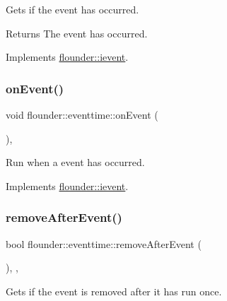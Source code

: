 Gets if the event has occurred. 

\begin{DoxyReturn}{Returns}
The event has occurred. 
\end{DoxyReturn}


Implements \hyperlink{classflounder_1_1ievent_a4462f66feef99ef4e3521c00f4edd0c9}{flounder\+::ievent}.

\mbox{\label{classflounder_1_1eventtime_a1b066c00fa959786bb1e9bbd1d212691}} 
\subsubsection{\texorpdfstring{on\+Event()}{onEvent()}}
{\footnotesize\ttfamily void flounder\+::eventtime\+::on\+Event (\begin{DoxyParamCaption}{ }\end{DoxyParamCaption})\hspace{0.3cm}{\ttfamily [override]}, {\ttfamily [virtual]}}



Run when a event has occurred. 



Implements \hyperlink{classflounder_1_1ievent_a6c6abe67435870b25eccd57a251a8992}{flounder\+::ievent}.

\mbox{\label{classflounder_1_1eventtime_ad765cd1e3b8fe2bf95f2290f5c625af1}} 
\subsubsection{\texorpdfstring{remove\+After\+Event()}{removeAfterEvent()}}
{\footnotesize\ttfamily bool flounder\+::eventtime\+::remove\+After\+Event (\begin{DoxyParamCaption}{ }\end{DoxyParamCaption})\hspace{0.3cm}{\ttfamily [inline]}, {\ttfamily [override]}, {\ttfamily [virtual]}}



Gets if the event is removed after it has run once. 

